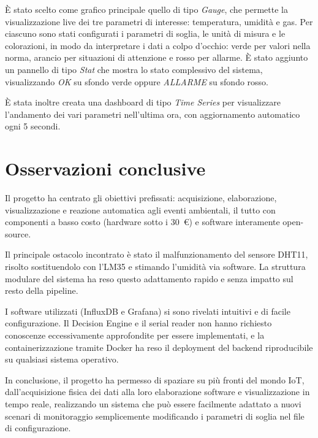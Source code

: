 \documentclass{article}
\begin{document}
È stato scelto come grafico principale quello di tipo \textit{Gauge}, che
permette la visualizzazione live dei tre parametri di interesse: temperatura,
umidità e gas. Per ciascuno sono stati configurati i parametri di soglia,
le unità di misura e le colorazioni, in modo da interpretare i dati a colpo
d'occhio: verde per valori nella norma, arancio per situazioni di attenzione
e rosso per allarme. È stato aggiunto un pannello di tipo \textit{Stat} che
mostra lo stato complessivo del sistema, visualizzando \textit{OK} su sfondo
verde oppure \textit{ALLARME} su sfondo rosso.

È stata inoltre creata una dashboard di tipo \textit{Time Series} per
visualizzare l'andamento dei vari parametri nell'ultima ora, con aggiornamento
automatico ogni 5 secondi.

\section{Osservazioni conclusive}


Il progetto ha centrato gli obiettivi prefissati: acquisizione, elaborazione,
visualizzazione e reazione automatica agli eventi ambientali, il tutto con
componenti a basso costo (hardware sotto i 30~€) e software interamente
open-source.

Il principale ostacolo incontrato è stato il malfunzionamento del sensore
DHT11, risolto sostituendolo con l'LM35 e stimando l'umidità via software.
La struttura modulare del sistema ha reso questo adattamento rapido e senza
impatto sul resto della pipeline.

I software utilizzati (InfluxDB e Grafana) si sono rivelati intuitivi e di
facile configurazione. Il Decision Engine e il serial reader non hanno
richiesto conoscenze eccessivamente approfondite per essere implementati, e
la containerizzazione tramite Docker ha reso il deployment del backend
riproducibile su qualsiasi sistema operativo.

In conclusione, il progetto ha permesso di spaziare su più fronti del mondo
IoT, dall'acquisizione fisica dei dati alla loro elaborazione software e
visualizzazione in tempo reale, realizzando un sistema che può essere
facilmente adattato a nuovi scenari di monitoraggio semplicemente modificando
i parametri di soglia nel file di configurazione.
\end{document}
